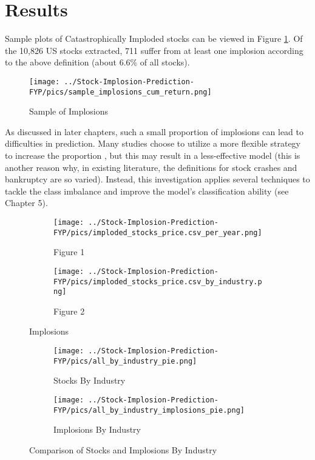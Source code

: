 \documentclass[a4paper]{report}
\begin{document}
\section{Results}
Sample plots of Catastrophically Imploded stocks can be viewed in Figure \ref{fig:sample_implosions}. Of the 10,826 US stocks extracted, 711 suffer from at least one implosion according to the above definition (about 6.6\% of all stocks).
\begin{figure}[h] %
  \centering
  \texttt{[image: ../Stock-Implosion-Prediction-FYP/pics/sample\_implosions\_cum\_return.png]} %
  \caption{Sample of Implosions}
  \label{fig:sample_implosions}
\end{figure} As discussed in later chapters, such a small proportion of implosions 
can lead to difficulties in prediction. Many studies choose to utilize a more flexible strategy to increase the proportion \citep{mckibben2017predicting}, but this may result in a less-effective model (this is 
another reason why, in existing literature, the definitions for stock crashes and bankruptcy are so varied). Instead, this investigation applies several techniques to tackle the class imbalance and improve the model's classification ability (see Chapter 5).
\begin{figure}[h]
  \centering
  \begin{subfigure}{0.9\textwidth}
    \texttt{[image: ../Stock-Implosion-Prediction-FYP/pics/imploded\_stocks\_price.csv\_per\_year.png]}
    \caption{Figure 1}
    \label{fig:implosions_year}
  \end{subfigure}
  \hspace{1cm}
  \begin{subfigure}{0.9\textwidth}
    \texttt{[image: ../Stock-Implosion-Prediction-FYP/pics/imploded\_stocks\_price.csv\_by\_industry.png]}
    \caption{Figure 2}
    \label{fig:industry}
  \end{subfigure}
  \caption{Implosions}
  \label{fig:two_figures}
\end{figure}
\begin{figure}[h] %
  \centering
  \begin{subfigure}{0.4\textwidth}
    \centering
    \texttt{[image: ../Stock-Implosion-Prediction-FYP/pics/all\_by\_industry\_pie.png]} %
    \caption{Stocks By Industry}
    \label{fig:industry_all}
  \end{subfigure}
  \begin{subfigure}{0.4\textwidth}
    \centering
    \texttt{[image: ../Stock-Implosion-Prediction-FYP/pics/all\_by\_industry\_implosions\_pie.png]} %
    \caption{Implosions By Industry}
    \label{fig:industry_implosions_pie}
  \end{subfigure}
  \caption{Comparison of Stocks and Implosions By Industry}
  \label{fig:industry_comparison}
\end{figure}
\end{document}
